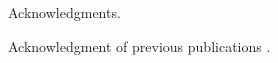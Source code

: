 
\begin{acknowledgments}

Acknowledgments.

Acknowledgment of previous publications .

\end{acknowledgments}
